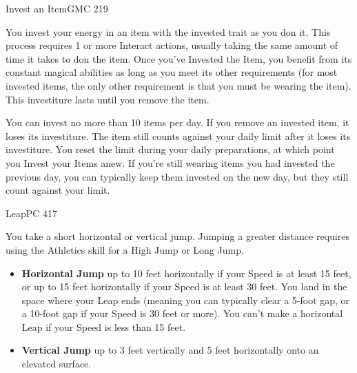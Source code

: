\documentclass[12pt,openany,twocolumn]{book}
\begin{document}
\begin{action}{Invest an Item}{}{GMC 219}
    \begin{actionbody}
        You invest your energy in an item with the invested trait as you don it. This process requires 1 or more Interact actions, usually taking the same amount of time it takes to don the item. Once you've Invested the Item, you benefit from its constant magical abilities as long as you meet its other requirements (for most invested items, the only other requirement is that you must be wearing the item). This investiture lasts until you remove the item.

        You can invest no more than 10 items per day. If you remove an invested item, it loses its investiture. The item still counts against your daily limit after it loses its investiture. You reset the limit during your daily preparations, at which point you Invest your Items anew. If you're still wearing items you had invested the previous day, you can typically keep them invested on the new day, but they still count against your limit.
    \end{actionbody}
\end{action}

\begin{action}{Leap}{}{PC 417}
    \begin{actioninfo}
    \end{actioninfo}

    \begin{actionbody}
        You take a short horizontal or vertical jump. Jumping a greater distance requires using the Athletics skill for a High Jump or Long Jump.

        \begin{itemize}
            \item \textbf{Horizontal Jump} up to 10 feet horizontally if your Speed is at least 15 feet, or up to 15 feet horizontally if your Speed is at least 30 feet. You land in the space where your Leap ends (meaning you can typically clear a 5-foot gap, or a 10-foot gap if your Speed is 30 feet or more). You can't make a horizontal Leap if your Speed is less than 15 feet.
            \item \textbf{Vertical Jump} up to 3 feet vertically and 5 feet horizontally onto an elevated surface.
        \end{itemize}
    \end{actionbody}
\end{action}
\end{document}
